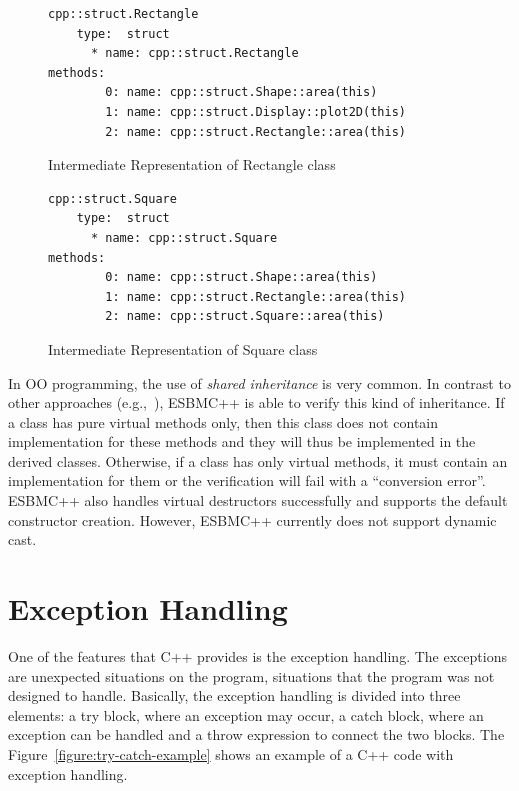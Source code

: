 \documentclass[a4paper]{llncs}
\begin{document}
\begin{figure}[h]
\centering
\begin{minipage}{0.9\textwidth}
\begin{lstlisting}[style=nonumbers]
cpp::struct.Rectangle
    type:  struct
      * name: cpp::struct.Rectangle
methods:
        0: name: cpp::struct.Shape::area(this)
        1: name: cpp::struct.Display::plot2D(this)
        2: name: cpp::struct.Rectangle::area(this)
\end{lstlisting}
\end{minipage}
\caption{Intermediate Representation of Rectangle class}
\label{figure:IR_uml_rec}
\end{figure}


\begin{figure}[h]
\centering
\begin{minipage}{0.9\textwidth}
\begin{lstlisting}[style=nonumbers]
cpp::struct.Square
    type:  struct
      * name: cpp::struct.Square
methods:
        0: name: cpp::struct.Shape::area(this)
        1: name: cpp::struct.Rectangle::area(this)
        2: name: cpp::struct.Square::area(this)
\end{lstlisting}
\end{minipage}
\caption{Intermediate Representation of Square class}
\label{figure:IR_uml_square}
\end{figure}

In OO programming, the use of \textit{shared inheritance} is very common.
In contrast to other approaches (e.g.,~\cite{Blanc07}), ESBMC++ is able to
verify this kind of inheritance. If a class has pure virtual methods only,
then this class does not contain implementation for these methods and they will
thus be implemented in the derived classes. Otherwise, if a class has only virtual
methods, it must contain an implementation for them or the verification will fail
with a ``conversion error''. ESBMC++ also handles virtual destructors successfully
and supports the default constructor creation. However, ESBMC++ currently does not
support dynamic cast.

\section{Exception Handling}
\label{exception-handling}

One of the features that C++ provides is the exception handling. The exceptions are unexpected situations on the program, situations
that the program was not designed to handle. Basically, the exception handling is divided into three elements: a try block, where an
exception may occur, a catch block, where an exception can be handled and a throw expression to connect the two blocks. The
Figure~\ref{figure:try-catch-example} shows an example of a C++ code with exception handling.
\end{document}
